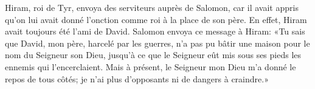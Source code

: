 Hiram, roi de Tyr, envoya des serviteurs auprès de Salomon,
	car il avait appris qu’on lui avait donné l’onction comme roi à la place de son père.
	En effet, Hiram avait toujours été l’ami de David.
Salomon envoya ce message à Hiram:
	«Tu sais que David, mon père, harcelé par les guerres,
	n’a pas pu bâtir une maison pour le nom du Seigneur son Dieu,
	jusqu’à ce que le Seigneur eût mis sous ses pieds les ennemis qui l’encerclaient.
Mais à présent, le Seigneur mon Dieu m’a donné le repos de tous côtés;
	je n’ai plus d’opposants ni de dangers à craindre.»
